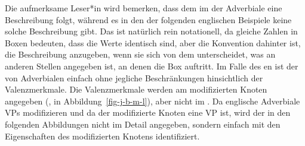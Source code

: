 
Die aufmerksame Leser*in wird bemerken, dass dem  im \modw der
Adverbiale eine Beschreibung folgt, während es in den \modwen der folgenden englischen Beispiele keine solche
Beschreibung gibt. Das ist natürlich rein notationell, da gleiche Zahlen in Boxen bedeuten, dass die
Werte identisch sind, aber die Konvention dahinter ist, die Beschreibung anzugeben, wenn sie sich von dem unterscheidet, was
an anderen Stellen angegeben ist, an denen die Box auftritt. Im Falle des en ist der \modw von Adverbialen einfach
 ohne jegliche Beschränkungen hinsichtlich der Valenzmerkmale. Die Valenzmerkmale werden am
modifizierten Knoten angegeben (\zb \spr \eliste, \comps {} in
Abbildung~\ref{fig-j-b-m-l}), aber nicht im \modw. Da englische Adverbiale VPs modifizieren und da der
modifizierte Knoten eine VP ist, wird der \modw in den folgenden Abbildungen nicht im Detail angegeben, sondern einfach mit den
Eigenschaften des modifizierten Knotens identifiziert.

